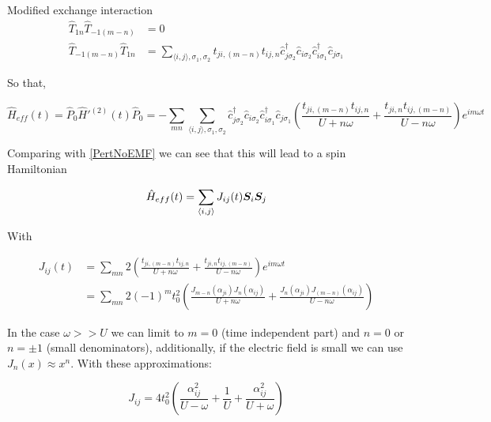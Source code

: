 \begin{section}{Modified exchange interaction}
\begin{align*}
\hat{T}_{1n} \hat{T}_{-1(m-n)} &= 0 \\
\hat{T}_{-1(m-n)} \hat{T}_{1n} &= \sum_{\langle i,j \rangle, \sigma_1, \sigma_2} t_{ji,(m-n)} t_{ij,n} \hat{c}_{j \sigma_2}^\dagger \hat{c}_{i \sigma_2} \hat{c}_{i \sigma_1}^\dagger \hat{c}_{j \sigma_1}
\end{align*}

So that,

\begin{equation}
\hat{H}_{eff}(t) = \hat{P}_0\hat{H}'^{(2)}(t)\hat{P}_0 = - \sum_{mn} \sum_{\langle i,j \rangle, \sigma_1, \sigma_2}\hat{c}_{j \sigma_2}^\dagger \hat{c}_{i \sigma_2} \hat{c}_{i \sigma_1}^\dagger \hat{c}_{j \sigma_1} \left( \frac{t_{ji,(m-n)} t_{ij,n}}{U+n\omega} + \frac{t_{ji,n} t_{ij,(m-n)}}{U-n\omega} \right) e^{im\omega t}
\end{equation}

Comparing with \ref{PertNoEMF} we can see that this will lead to a spin Hamiltonian 

\begin{equation}
\hat{H}_{eff}(t) = \sum_{\langle i,j \rangle} J_{ij}(t) \boldsymbol{S}_i \boldsymbol{S}_j
\end{equation}

With 

\begin{align}
J_{ij}(t) &= \sum_{mn} 2\left( \frac{t_{ji,(m-n)} t_{ij,n}}{U+n\omega} + \frac{t_{ji,n} t_{ij,(m-n)}}{U-n\omega} \right) e^{im\omega t} \nonumber \\
&= \sum_{mn} 2(-1)^m t_0^2 \left( \frac{J_{m-n}(\alpha_{ji})J_n(\alpha_{ij})}{U+n\omega} +\frac{J_n(\alpha_{ji})J_{(m-n)}(\alpha_{ij})}{U-n\omega} \right)
\end{align}

In the case $\omega >> U$ we can limit to $m=0$ (time independent part) and $n=0$ or $n=\pm1$ (small denominators), additionally, if the electric field is small we can use $J_n(x) \approx x^n$. With these approximations: 

\begin{equation}
J_{ij} = 4 t_0^2 \left( \frac{\alpha_{ij}^2}{U-\omega} + \frac{1}{U} + \frac{\alpha_{ij}^2}{U+\omega} \right)
\end{equation}

\end{section}

